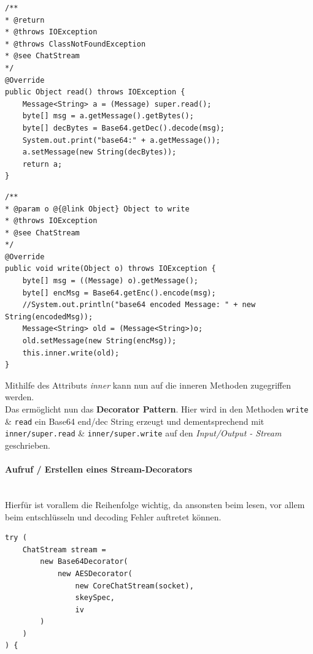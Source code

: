 			\begin{minipage}{.5\textwidth}
				\begin{lstlisting}[style=JavaL, caption={read - Base64Decorator}]
/**
* @return
* @throws IOException
* @throws ClassNotFoundException
* @see ChatStream
*/
@Override
public Object read() throws IOException {
	Message<String> a = (Message) super.read();
	byte[] msg = a.getMessage().getBytes();
	byte[] decBytes = Base64.getDec().decode(msg);
	System.out.print("base64:" + a.getMessage());
	a.setMessage(new String(decBytes));
	return a;
}
				\end{lstlisting}
			\end{minipage}%
			\begin{minipage}{.5\textwidth}
				\begin{lstlisting}[style=JavaR, caption={write - Base64Decorator}]
/**
* @param o @{@link Object} Object to write
* @throws IOException
* @see ChatStream
*/
@Override
public void write(Object o) throws IOException {
	byte[] msg = ((Message) o).getMessage();
	byte[] encMsg = Base64.getEnc().encode(msg);
	//System.out.println("base64 encoded Message: " + new String(encodedMsg));
	Message<String> old = (Message<String>)o;
	old.setMessage(new String(encMsg));
	this.inner.write(old);
}
				\end{lstlisting}
			\end{minipage}
			
			Mithilfe des Attributs \textit{inner} kann nun auf die inneren Methoden zugegriffen werden.\\
			Das ermöglicht nun das \textbf{Decorator Pattern}. Hier wird in den Methoden \texttt{write} \& \texttt{read} ein Base64 end/dec String erzeugt und dementsprechend mit \texttt{inner/super.read} \& \texttt{inner/super.write} auf den \textit{Input/Output - Stream} geschrieben.
			
			
			\paragraph{Aufruf / Erstellen eines Stream-Decorators}\mbox{}
			\vspace{0.15cm}\\
			Hierfür ist vorallem die Reihenfolge wichtig, da ansonsten beim lesen, vor allem beim entschlüsseln und decoding Fehler auftretet können.
			
			\begin{lstlisting}[style=JavaG, caption={erstellen / Aufrufen eines Decorators}]
try (
	ChatStream stream =
		new Base64Decorator(
			new AESDecorator(
				new CoreChatStream(socket),
				skeySpec,
				iv
		)
	)
) {
			\end{lstlisting}
			
